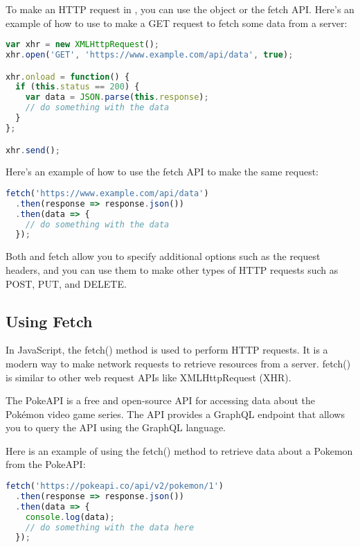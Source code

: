 {To make an HTTP request in , you can use the  object or the fetch API. Here's an example of how to use  to make a GET request to fetch some data from a server:


\begin{lstlisting}[language=Javascript, caption=How to make a HTTP request in Javascript]
var xhr = new XMLHttpRequest();
xhr.open('GET', 'https://www.example.com/api/data', true);

xhr.onload = function() {
  if (this.status == 200) {
    var data = JSON.parse(this.response);
    // do something with the data
  }
};

xhr.send();

\end{lstlisting}

Here's an example of how to use the fetch API to make the same request:

\begin{lstlisting}[language=Javascript, caption=HTTP request using fetch]
fetch('https://www.example.com/api/data')
  .then(response => response.json())
  .then(data => {
    // do something with the data
  });

\end{lstlisting}

Both  and fetch allow you to specify additional options such as the request headers, and you can use them to make other types of HTTP requests such as POST, PUT, and DELETE.


\subsection{Using Fetch}
In JavaScript, the fetch() method is used to perform HTTP requests. It is a modern way to make network requests to retrieve resources from a server. fetch() is similar to other web request APIs like XMLHttpRequest (XHR).

The PokeAPI is a free and open-source API for accessing data about the Pokémon video game series. The API provides a GraphQL endpoint that allows you to query the API using the GraphQL language.

Here is an example of using the fetch() method to retrieve data about a Pokemon from the PokeAPI:

\begin{lstlisting}[language=Javascript, caption=Fetching entry from poke api]
fetch('https://pokeapi.co/api/v2/pokemon/1')
  .then(response => response.json())
  .then(data => {
    console.log(data);
    // do something with the data here
  });
\end{lstlisting}

}
